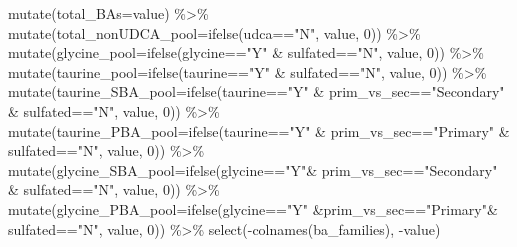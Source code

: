 \documentclass[
]{book}
\newenvironment{Shaded}{\begin{snugshade}}{\end{snugshade}}
\newcommand{\AttributeTok}[1]{\textcolor[rgb]{0.77,0.63,0.00}{#1}}
\newcommand{\DecValTok}[1]{\textcolor[rgb]{0.00,0.00,0.81}{#1}}
\newcommand{\FunctionTok}[1]{\textcolor[rgb]{0.00,0.00,0.00}{#1}}
\newcommand{\NormalTok}[1]{#1}
\newcommand{\SpecialCharTok}[1]{\textcolor[rgb]{0.00,0.00,0.00}{#1}}
\newcommand{\StringTok}[1]{\textcolor[rgb]{0.31,0.60,0.02}{#1}}
\begin{document}
\begin{Shaded}
\begin{Highlighting}[]
  \FunctionTok{mutate}\NormalTok{(}\AttributeTok{total\_BAs=}\NormalTok{value) }\SpecialCharTok{\%\textgreater{}\%} 
  \FunctionTok{mutate}\NormalTok{(}\AttributeTok{total\_nonUDCA\_pool=}\FunctionTok{ifelse}\NormalTok{(udca}\SpecialCharTok{==}\StringTok{"N"}\NormalTok{, value, }\DecValTok{0}\NormalTok{)) }\SpecialCharTok{\%\textgreater{}\%} 
  \FunctionTok{mutate}\NormalTok{(}\AttributeTok{glycine\_pool=}\FunctionTok{ifelse}\NormalTok{(glycine}\SpecialCharTok{==}\StringTok{"Y"} \SpecialCharTok{\&}\NormalTok{ sulfated}\SpecialCharTok{==}\StringTok{"N"}\NormalTok{, value, }\DecValTok{0}\NormalTok{)) }\SpecialCharTok{\%\textgreater{}\%} 
  \FunctionTok{mutate}\NormalTok{(}\AttributeTok{taurine\_pool=}\FunctionTok{ifelse}\NormalTok{(taurine}\SpecialCharTok{==}\StringTok{"Y"} \SpecialCharTok{\&}\NormalTok{ sulfated}\SpecialCharTok{==}\StringTok{"N"}\NormalTok{, value, }\DecValTok{0}\NormalTok{)) }\SpecialCharTok{\%\textgreater{}\%} 
  \FunctionTok{mutate}\NormalTok{(}\AttributeTok{taurine\_SBA\_pool=}\FunctionTok{ifelse}\NormalTok{(taurine}\SpecialCharTok{==}\StringTok{"Y"} \SpecialCharTok{\&}\NormalTok{ prim\_vs\_sec}\SpecialCharTok{==}\StringTok{"Secondary"} \SpecialCharTok{\&}\NormalTok{ sulfated}\SpecialCharTok{==}\StringTok{"N"}\NormalTok{, value, }\DecValTok{0}\NormalTok{)) }\SpecialCharTok{\%\textgreater{}\%} 
  \FunctionTok{mutate}\NormalTok{(}\AttributeTok{taurine\_PBA\_pool=}\FunctionTok{ifelse}\NormalTok{(taurine}\SpecialCharTok{==}\StringTok{"Y"} \SpecialCharTok{\&}\NormalTok{ prim\_vs\_sec}\SpecialCharTok{==}\StringTok{"Primary"} \SpecialCharTok{\&}\NormalTok{ sulfated}\SpecialCharTok{==}\StringTok{"N"}\NormalTok{, value, }\DecValTok{0}\NormalTok{)) }\SpecialCharTok{\%\textgreater{}\%} 
  \FunctionTok{mutate}\NormalTok{(}\AttributeTok{glycine\_SBA\_pool=}\FunctionTok{ifelse}\NormalTok{(glycine}\SpecialCharTok{==}\StringTok{"Y"}\SpecialCharTok{\&}\NormalTok{ prim\_vs\_sec}\SpecialCharTok{==}\StringTok{"Secondary"} \SpecialCharTok{\&}\NormalTok{ sulfated}\SpecialCharTok{==}\StringTok{"N"}\NormalTok{, value, }\DecValTok{0}\NormalTok{)) }\SpecialCharTok{\%\textgreater{}\%} 
  \FunctionTok{mutate}\NormalTok{(}\AttributeTok{glycine\_PBA\_pool=}\FunctionTok{ifelse}\NormalTok{(glycine}\SpecialCharTok{==}\StringTok{"Y"} \SpecialCharTok{\&}\NormalTok{prim\_vs\_sec}\SpecialCharTok{==}\StringTok{"Primary"}\SpecialCharTok{\&}\NormalTok{ sulfated}\SpecialCharTok{==}\StringTok{"N"}\NormalTok{, value, }\DecValTok{0}\NormalTok{)) }\SpecialCharTok{\%\textgreater{}\%} 
  \FunctionTok{select}\NormalTok{(}\SpecialCharTok{{-}}\FunctionTok{colnames}\NormalTok{(ba\_families), }\SpecialCharTok{{-}}\NormalTok{value) }


\end{Highlighting}
\end{Shaded}
\end{document}
